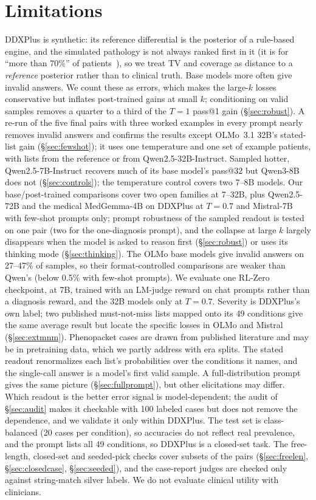 \documentclass[11pt]{article}
\begin{document}
\section{Limitations}
DDXPlus is synthetic: its reference differential is the posterior of a rule-based engine, and the simulated pathology is not always ranked first in it (it is for ``more than 70\%'' of patients~\citep[\S3.5]{fansi2022ddxplus}), so we treat TV and coverage as distance to a \emph{reference} posterior rather than to clinical truth.
Base models more often give invalid answers. We count these as errors, which makes the large-$k$ losses conservative but inflates post-trained gains at small $k$; conditioning on valid samples removes a quarter to a third of the $T{=}1$ pass@1 gain (\S\ref{sec:robust}). A re-run of the five final pairs with three worked examples in every prompt nearly removes invalid answers and confirms the results except OLMo~3.1 32B's stated-list gain (\S\ref{sec:fewshot}); it uses one temperature and one set of example patients, with lists from the reference or from Qwen2.5-32B-Instruct. Sampled hotter, Qwen2.5-7B-Instruct recovers much of its base model's pass@32 but Qwen3-8B does not (\S\ref{sec:controls}); the temperature control covers two 7--8B models.
Our base/post-trained comparisons cover two open families at 7--32B, plus Qwen2.5-72B and the medical MedGemma-4B on DDXPlus at $T{=}0.7$ and Mistral-7B with few-shot prompts only; prompt robustness of the sampled readout is tested on one pair (two for the one-diagnosis prompt), and the collapse at large $k$ largely disappears when the model is asked to reason first (\S\ref{sec:robust}) or uses its thinking mode (\S\ref{sec:thinking}). The OLMo base models give invalid answers on 27--47\% of samples, so their format-controlled comparisons are weaker than Qwen's (below 0.5\% with few-shot prompts). We evaluate one RL-Zero checkpoint, at 7B, trained with an LM-judge reward on chat prompts rather than a diagnosis reward, and the 32B models only at $T{=}0.7$.
Severity is DDXPlus's own label; two published must-not-miss lists mapped onto its 49 conditions give the same average result but locate the specific losses in OLMo and Mistral (\S\ref{sec:extmnm}).
Phenopacket cases are drawn from published literature and may be in pretraining data, which we partly address with era splits.
The stated readout renormalizes each list's probabilities over the conditions it names, and the single-call answer is a model's first valid sample. A full-distribution prompt gives the same picture (\S\ref{sec:fullprompt}), but other elicitations may differ. Which readout is the better error signal is model-dependent; the audit of \S\ref{sec:audit} makes it checkable with 100 labeled cases but does not remove the dependence, and we validate it only within DDXPlus. The test set is class-balanced (20 cases per condition), so accuracies do not reflect real prevalence, and the prompt lists all 49 conditions, so DDXPlus is a closed-set task.
The free-length, closed-set and seeded-pick checks cover subsets of the pairs (\S\ref{sec:freelen}, \S\ref{sec:closedcase}, \S\ref{sec:seeded}), and the case-report judges are checked only against string-match silver labels.
We do not evaluate clinical utility with clinicians.



\end{document}

